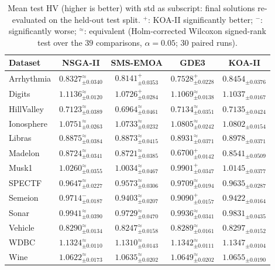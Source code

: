 \begin{table}[!htbp]
\caption{Mean test HV (higher is better) with std as subscript: final solutions re-evaluated on the held-out test split. $^+$: KOA-II significantly better; $^-$: significantly worse; $^\approx$: equivalent (Holm-corrected Wilcoxon signed-rank test over the $39$ comparisons, $\alpha=0.05$; 30 paired runs).}
\label{tab:fs_hv_test}
\centering
\small
\setlength{\tabcolsep}{4pt}
\renewcommand{\arraystretch}{1.25}
\begin{tabular}{@{}lcccc@{}}
\hline
\textbf{Dataset} & \textbf{NSGA-II} & \textbf{SMS-EMOA} & \textbf{GDE3} & \textbf{KOA-II} \\
\hline
Arrhythmia & $0.8327_{\pm0.0340}^{\approx}$ & $0.8141_{\pm0.0353}^{+}$ & $0.7528_{\pm0.0228}^{+}$ & $\mathbf{0.8454}_{\pm0.0376}$ \\
Digits & $\mathbf{1.1136}_{\pm0.0120}^{\approx}$ & $1.0726_{\pm0.0284}^{+}$ & $1.1069_{\pm0.0138}^{\approx}$ & $1.1037_{\pm0.0167}$ \\
HillValley & $0.7123_{\pm0.0389}^{\approx}$ & $0.6964_{\pm0.0461}^{\approx}$ & $0.7134_{\pm0.0351}^{\approx}$ & $\mathbf{0.7135}_{\pm0.0424}$ \\
Ionosphere & $1.0751_{\pm0.0263}^{\approx}$ & $1.0733_{\pm0.0232}^{\approx}$ & $\mathbf{1.0805}_{\pm0.0242}^{\approx}$ & $1.0802_{\pm0.0154}$ \\
Libras & $0.8875_{\pm0.0384}^{\approx}$ & $0.8873_{\pm0.0415}^{\approx}$ & $0.8931_{\pm0.0371}^{\approx}$ & $\mathbf{0.8978}_{\pm0.0371}$ \\
Madelon & $\mathbf{0.8724}_{\pm0.0341}^{\approx}$ & $0.8721_{\pm0.0385}^{\approx}$ & $0.6700_{\pm0.0142}^{+}$ & $0.8541_{\pm0.0509}$ \\
Musk1 & $\mathbf{1.0260}_{\pm0.0355}^{\approx}$ & $1.0034_{\pm0.0467}^{\approx}$ & $0.9901_{\pm0.0347}^{+}$ & $1.0145_{\pm0.0377}$ \\
SPECTF & $0.9647_{\pm0.0227}^{\approx}$ & $0.9573_{\pm0.0306}^{\approx}$ & $\mathbf{0.9709}_{\pm0.0194}^{\approx}$ & $0.9635_{\pm0.0287}$ \\
Semeion & $\mathbf{0.9714}_{\pm0.0187}^{-}$ & $0.9403_{\pm0.0207}^{\approx}$ & $0.9090_{\pm0.0157}^{+}$ & $0.9422_{\pm0.0164}$ \\
Sonar & $\mathbf{0.9941}_{\pm0.0390}^{\approx}$ & $0.9729_{\pm0.0470}^{\approx}$ & $0.9936_{\pm0.0341}^{\approx}$ & $0.9831_{\pm0.0435}$ \\
Vehicle & $0.8290_{\pm0.0134}^{\approx}$ & $0.8247_{\pm0.0158}^{\approx}$ & $0.8289_{\pm0.0161}^{\approx}$ & $\mathbf{0.8297}_{\pm0.0152}$ \\
WDBC & $1.1324_{\pm0.0110}^{\approx}$ & $1.1310_{\pm0.0143}^{\approx}$ & $1.1342_{\pm0.0111}^{\approx}$ & $\mathbf{1.1347}_{\pm0.0104}$ \\
Wine & $1.0622_{\pm0.0173}^{\approx}$ & $1.0635_{\pm0.0202}^{\approx}$ & $1.0649_{\pm0.0202}^{\approx}$ & $\mathbf{1.0655}_{\pm0.0190}$ \\
\hline
\end{tabular}
\end{table}

